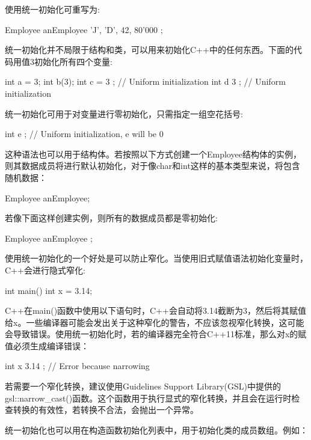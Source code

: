 使用统一初始化可重写为:

\begin{cpp}
Employee anEmployee { 'J', 'D', 42, 80'000 };
\end{cpp}

统一初始化并不局限于结构和类，可以用来初始化C++中的任何东西。下面的代码用值3初始化所有四个变量:

\begin{cpp}
int a = 3;
int b(3);
int c = { 3 }; // Uniform initialization
int d { 3 }; // Uniform initialization
\end{cpp}

统一初始化可用于对变量进行零初始化，只需指定一组空花括号:

\begin{cpp}
int e { }; // Uniform initialization, e will be 0
\end{cpp}

这种语法也可以用于结构体。若按照以下方式创建一个Employee结构体的实例，则其数据成员将进行默认初始化，对于像char和int这样的基本类型来说，将包含随机数据：

\begin{cpp}
Employee anEmployee;
\end{cpp}

若像下面这样创建实例，则所有的数据成员都是零初始化:

\begin{cpp}
Employee anEmployee { };
\end{cpp}

使用统一初始化的一个好处是可以防止窄化。当使用旧式赋值语法初始化变量时，C++会进行隐式窄化:

\begin{cpp}
int main()
{
    int x = 3.14;
}
\end{cpp}

C++在main()函数中使用以下语句时，C++会自动将3.14截断为3，然后将其赋值给x。一些编译器可能会发出关于这种窄化的警告，不应该忽视窄化转换，这可能会导致错误。使用统一初始化时，若的编译器完全符合C++11标准，那么对x的赋值必须生成编译错误：

\begin{cpp}
int x { 3.14 }; // Error because narrowing
\end{cpp}

若需要一个窄化转换，建议使用Guidelines Support Library(GSL)中提供的gsl::narrow\_cast()函数。这个函数用于执行显式的窄化转换，并且会在运行时检查转换的有效性，若转换不合法，会抛出一个异常。

统一初始化也可以用在构造函数初始化列表中，用于初始化类的成员数组。例如：

